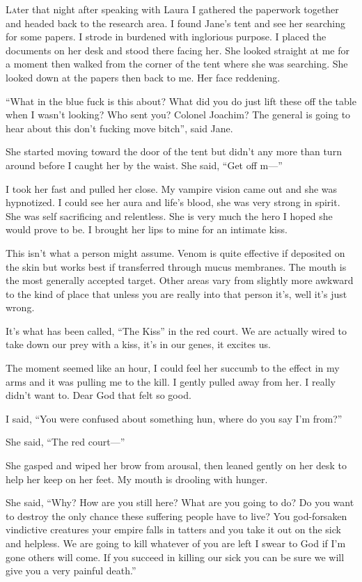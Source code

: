 \lettrine[lines=2,lraise=0]{L}ater that night after speaking with Laura I gathered the paperwork together and headed back to the research area. I found Jane's tent and see her searching for some papers. I strode in burdened with inglorious purpose. I placed the documents on her desk and stood there facing her. She looked straight at me for a moment then walked from the corner of the tent where she was searching. She looked down at the papers then back to me. Her face reddening.

``What in the blue fuck is this about? What did you do just lift these off the table when I wasn't looking? Who sent you? Colonel Joachim? The general is going to hear about this don't fucking move bitch'', said Jane.

She started moving toward the door of the tent but didn't any more than turn around before I caught her by the waist. She said, ``Get off m---''

I took her fast and pulled her close. My vampire vision came out and she was hypnotized. I could see her aura and life's blood, she was very strong in spirit. She was self sacrificing and relentless. She is very much the hero I hoped she would prove to be. I brought her lips to mine for an intimate kiss. 

This isn't what a person might assume. Venom is quite effective if deposited on the skin but works best if transferred through mucus membranes. The mouth is the most generally accepted target. Other areas vary from slightly more awkward to the kind of place that unless you are really into that person it's, well it's just wrong.

It's what has been called, ``The Kiss'' in the red court. We are actually wired to take down our prey with a kiss, it's in our genes, it excites us.

The moment seemed like an hour, I could feel her succumb to the effect in my arms and it was pulling me to the kill. I gently pulled away from her. I really didn't want to. Dear God that felt so good.

I said, ``You were confused about something hun, where do you say I'm from?''

She said, ``The red court---''

She gasped and wiped her brow from arousal, then leaned gently on her desk to help her keep on her feet. My mouth is drooling with hunger.

She said, ``Why? How are you still here? What are you going to do? Do you want to destroy the only chance these suffering people have to live? You god-forsaken vindictive creatures your empire falls in tatters and you take it out on the sick and helpless. We are going to kill whatever of you are left I swear to God if I'm gone others will come. If you succeed in killing our sick you can be sure we will give you a very painful death.''

